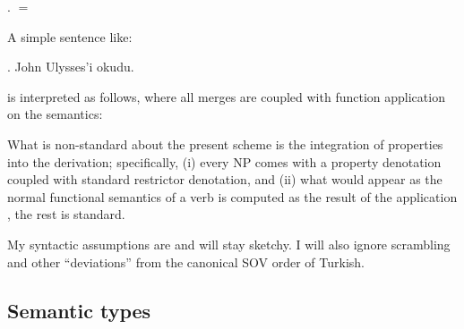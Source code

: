 \documentclass[11pt,a4paper]{article}
\begin{document}
\ex.  $=$ 

A simple sentence like:

\ex. John Ulysses'i okudu.

is interpreted as follows, where all merges are coupled with function application on the semantics:



What is non-standard about the present scheme is the integration of properties
into the derivation; specifically, (i) every NP comes with a property
denotation coupled with standard restrictor denotation, and (ii) what would
appear as the normal functional semantics of a verb is computed as the result
of the application , the rest is standard.

My syntactic assumptions are and will stay sketchy. I will also ignore
scrambling and other ``deviations'' from the canonical SOV order of Turkish.


\subsection{Semantic types}
\end{document}
